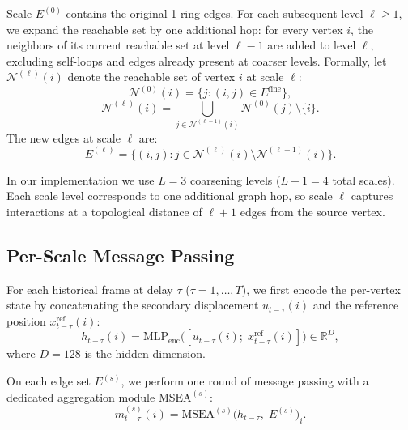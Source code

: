 \documentclass[10pt,twocolumn]{article}
\begin{document}
Scale $E^{(0)}$ contains the original 1-ring edges. For each subsequent level $\ell \geq 1$, we expand the reachable set by one additional hop: for every vertex $i$, the neighbors of its current reachable set at level $\ell-1$ are added to level $\ell$, excluding self-loops and edges already present at coarser levels. Formally, let $\mathcal{N}^{(\ell)}(i)$ denote the reachable set of vertex $i$ at scale $\ell$:
\begin{equation}
    \mathcal{N}^{(0)}(i) = \{j : (i,j) \in E^{\mathrm{fine}}\},
\end{equation}
\begin{equation}
    \mathcal{N}^{(\ell)}(i) = \bigcup_{j \in \mathcal{N}^{(\ell-1)}(i)} \mathcal{N}^{(0)}(j) \setminus \{i\}.
\end{equation}
The new edges at scale $\ell$ are:
\begin{equation}
    E^{(\ell)} = \{(i,j) : j \in \mathcal{N}^{(\ell)}(i) \setminus \mathcal{N}^{(\ell-1)}(i)\}.
\end{equation}

In our implementation we use $L=3$ coarsening levels ($L+1=4$ total scales). Each scale level corresponds to one additional graph hop, so scale $\ell$ captures interactions at a topological distance of $\ell+1$ edges from the source vertex.

\subsection{Per-Scale Message Passing}

For each historical frame at delay $\tau$ ($\tau = 1, \dots, T$), we first encode the per-vertex state by concatenating the secondary displacement $u_{t-\tau}(i)$ and the reference position $x^{\mathrm{ref}}_{t-\tau}(i)$:
\begin{equation}
    h_{t-\tau}(i) = \mathrm{MLP}_{\mathrm{enc}}\!\big([u_{t-\tau}(i);\; x^{\mathrm{ref}}_{t-\tau}(i)]\big) \in \mathbb{R}^{D},
\end{equation}
where $D = 128$ is the hidden dimension.

On each edge set $E^{(s)}$, we perform one round of message passing with a dedicated aggregation module $\mathrm{MSEA}^{(s)}$:
\begin{equation}
    m^{(s)}_{t-\tau}(i) = \mathrm{MSEA}^{(s)}\!\big(h_{t-\tau},\; E^{(s)}\big)_i.
\end{equation}
\end{document}
